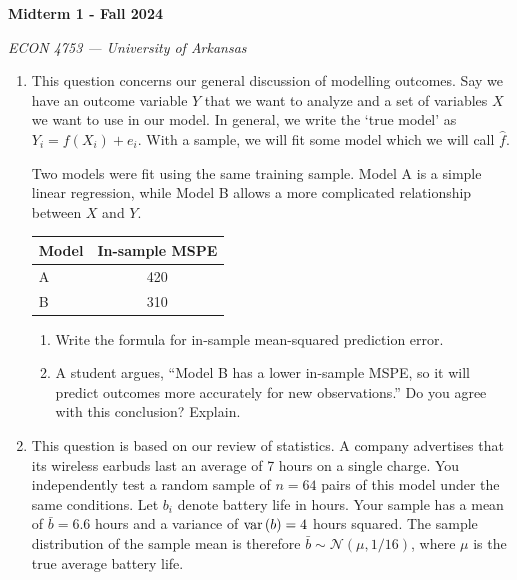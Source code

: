 \documentclass[12pt]{article}
\begin{document}
\begin{center}
  {\Huge\bf Midterm 1 - Fall 2024}
  
  \smallskip
  {\large\it ECON 4753 — University of Arkansas}
\end{center}

\vspace{5mm}
\begin{enumerate}
  \item This question concerns our general discussion of modelling outcomes. 
  Say we have an outcome variable $Y$ that we want to analyze and a set of variables $X$ we want to use in our model. 
  In general, we write the `true model' as $Y_i = f(X_i) + e_i$.
  With a sample, we will fit some model which we will call $\hat{f}$. 

  Two models were fit using the same training sample.
  Model A is a simple linear regression, while Model B allows a more complicated relationship between $X$ and $Y$.

  \begin{center}
    \begin{tabular}{lc}
      Model & In-sample MSPE \\
      \hline
      A & 420 \\
      B & 310 \\
    \end{tabular}
  \end{center}

  \begin{enumerate}
    \item Write the formula for in-sample mean-squared prediction error.
    
    \item A student argues, ``Model B has a lower in-sample MSPE, so it will predict outcomes more accurately for new observations.''
    Do you agree with this conclusion? Explain.
  \end{enumerate}


  \bigskip\bigskip
  \item This question is based on our review of statistics.
  A company advertises that its wireless earbuds last an average of 7 hours on a single charge.
  You independently test a random sample of $n = 64$ pairs of this model under the same conditions.
  Let $b_i$ denote battery life in hours.
  Your sample has a mean of $\bar{b} = 6.6$ hours and a variance of $\var{b} = 4$ hours squared.
  The sample distribution of the sample mean is therefore $\bar{b} \sim \mathcal{N}( \mu, 1 / 16 )$, where $\mu$ is the true average battery life.


\end{enumerate}
\end{document}

